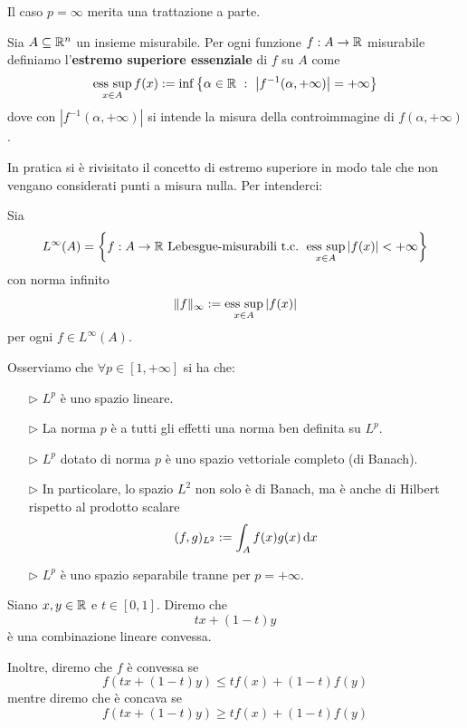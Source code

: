 Il caso $p=\infty$ merita una trattazione a parte.

\begin{defn}
Sia $A\subseteq\mathbb{R}^n$ un insieme misurabile. Per ogni funzione $f:A\to\mathbb{R}$ misurabile definiamo l'\textbf{estremo superiore essenziale} di $f$ su $A$ come
$$
\operatorname*{ess\ sup}_{x\in A} f(x):=\inf\left\{ \alpha\in\mathbb{R}\ :\ \left|f^{-1}(\alpha,+\infty) \right|=+\infty \right\}
$$
dove con $\left|f^{-1}(\alpha,+\infty) \right|$ si intende la misura della controimmagine di $f(\alpha,+\infty)$.
\end{defn}
In pratica si è rivisitato il concetto di estremo superiore in modo tale che non vengano considerati punti a misura nulla. Per intenderci:

\begin{defn}
Sia
\begin{equation*}
L^{\infty}(A) = \left\{f: A\rightarrow \mathbb{R}\text{ Lebesgue-misurabili t.c. }\operatorname*{ess\ sup}_{x\in A} |f(x)|<+ \infty \right\}
\end{equation*}
con norma infinito
\begin{equation*}
\Vert f \Vert_{\infty} := \operatorname*{ess\ sup}_{x\in A} |f(x)|
\end{equation*}
per ogni $f\in L^\infty(A)$.
\end{defn}

Osserviamo che $\forall p\in[1,+\infty]$ si ha che:
\begin{enumerate}
    \item [$\triangleright$] $L^p$ è uno spazio lineare.

    \item [$\triangleright$] La norma $p$ è a tutti gli effetti una norma ben definita su $L^p$.

    \item [$\triangleright$] $L^p$ dotato di norma $p$ è uno spazio vettoriale completo (di Banach).

    \item [$\triangleright$] In particolare, lo spazio $L^2$ non solo è di Banach, ma è anche di Hilbert rispetto al prodotto scalare
    $$
    (f,g)_{L^2}:=\int_A f(x) g(x)\, \mathrm{d} x
    $$

    \item [$\triangleright$] $L^p$ è uno spazio separabile tranne per $p=+\infty$.
\end{enumerate}

\begin{defn}
Siano $x,y\in\mathbb{R}$ e $t\in[0,1]$. Diremo che
$$
tx+(1-t)y
$$
è una combinazione lineare convessa.

Inoltre, diremo che $f$ è convessa se
$$
f(tx+(1-t)y)\leq t f(x)+(1-t)f(y)
$$
mentre diremo che è concava se
$$
f(tx+(1-t)y)\geq t f(x)+(1-t)f(y)
$$
\end{defn}

